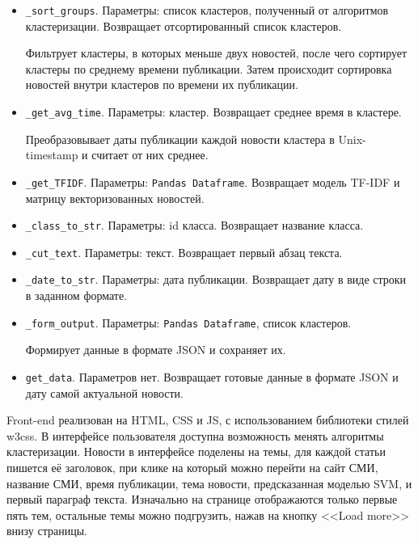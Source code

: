 \begin{itemize}
    \item \verb|_sort_groups|. Параметры: список кластеров, полученный от
    алгоритмов кластеризации. Возвращает отсортированный список кластеров.

    Фильтрует кластеры, в которых меньше двух новостей, после чего сортирует кластеры по среднему времени публикации.
    Затем происходит сортировка новостей внутри кластеров по времени их публикации.

    \item \verb|_get_avg_time|. Параметры: кластер. Возвращает среднее время
    в кластере.

    Преобразовывает даты публикации каждой новости кластера в Unix-timestamp и
    считает от них среднее.

    \item \verb|_get_TFIDF|. Параметры: \verb|Pandas Dataframe|.
    Возвращает модель TF-IDF и матрицу векторизованных новостей.

    \item \verb|_class_to_str|. Параметры: id класса.
    Возвращает название класса.

    \item \verb|_cut_text|. Параметры: текст.
    Возвращает первый абзац текста.

    \item \verb|_date_to_str|. Параметры: дата публикации.
    Возвращает дату в виде строки в заданном формате.

    \item \verb|_form_output|. Параметры: \verb|Pandas Dataframe|, список
    кластеров.

    Формирует данные в формате JSON и сохраняет их.

    \item \verb|get_data|. Параметров нет.
    Возвращает готовые данные в формате JSON и дату самой актуальной новости.
\end{itemize}

Front-end реализован на HTML, CSS и JS, с использованием библиотеки стилей w3css. 
В интерфейсе пользователя доступна возможность менять алгоритмы кластеризации. Новости в интерфейсе
поделены на темы, для каждой статьи пишется её заголовок, при клике на который можно
перейти на сайт СМИ, название СМИ, время публикации, тема новости, предсказанная моделью SVM,
и первый параграф текста. Изначально на странице отображаются только первые пять тем,
остальные темы можно подгрузить, нажав на кнопку <<Load more>> внизу страницы.

